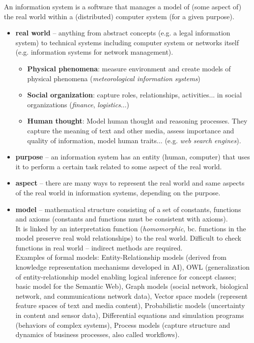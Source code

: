 An information system is a software that manages a model of (some aspect of) the real world within a (distributed) computer system (for a given purpose).

\begin{itemize}
	\item \textbf{real world} -- anything from abstract concepts (e.g. a legal information system) to technical systems including computer system or networks itself (e.g. information systems for network management).
	\begin{itemize}
		\item \textbf{Physical phenomena}: measure environment and create models of physical phenomena (\emph{meteorological
		information systems})
		\item \textbf{Social organization}: capture roles, relationships, activities... in social organizations (\emph{finance}, \emph{logistics}...)
		\item \textbf{Human thought}: Model human thought and reasoning processes. They capture the meaning of text and other media, assess importance and quality of information, model human traits... (e.g. \emph{web search engines}).
	\end{itemize}
	\item \textbf{purpose} -- an information system has an entity (human, computer) that uses it to perform a certain task related to some aspect of the real world.
	\item \textbf{aspect} -- there are many ways to represent the real world and same aspects of the real world in information systems, depending on the purpose.
	\item \textbf{model} -- mathematical structure consisting of a set of constants, functions and axioms (constants and functions must be consistent with axioms). \\
	It is linked by an interpretation function (\emph{homomorphic}, bc. functions in the model preserve real wold relationships) to the real world. Difficult to check functions in real world -- indirect methods are required.\\
	Examples of formal models: Entity-Relationship models (derived from knowledge representation mechanisms developed in AI), OWL (generalization of entity-relationship model enabling logical inference for concept classes; basic model for the Semantic Web), Graph models (social network, biological network, and communications network data), Vector space models (represent feature spaces of text and media content), Probabilistic models (uncertainty in content and sensor data), Differential equations and simulation programs (behaviors of complex systems), Process models (capture structure and dynamics of business processes, also called workflows).

\end{itemize}
